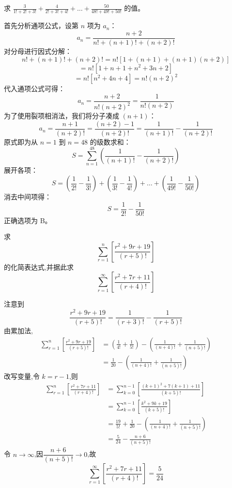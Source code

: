 \begin{questions}
    \question 求 $\frac{3}{1!+2!+3!} + \frac{4}{2!+3!+4!} + \dots + \frac{50}{48!+49!+50!}$ 的值。
\begin{solution}
首先分析通项公式，设第 $n$ 项为 $a_n$：
\[
a_n = \frac{n+2}{n! + (n+1)! + (n+2)!}
\]
对分母进行因式分解：
\[
n! + (n+1)! + (n+2)! = n! [1 + (n+1) + (n+1)(n+2)]
\]
\[
= n! [1 + n + 1 + n^2 + 3n + 2]
\]
\[
= n! [n^2 + 4n + 4] = n! (n+2)^2
\]
代入通项公式可得：
\[
a_n = \frac{n+2}{n! (n+2)^2} = \frac{1}{n! (n+2)}
\]
为了使用裂项相消法，我们将分子凑成 $(n+1)$：
\[
a_n = \frac{n+1}{(n+2)!} = \frac{(n+2) - 1}{(n+2)!} = \frac{1}{(n+1)!} - \frac{1}{(n+2)!}
\]
原式即为从 $n=1$ 到 $n=48$ 的级数求和：
\[
S = \sum_{n=1}^{48} \left( \frac{1}{(n+1)!} - \frac{1}{(n+2)!} \right)
\]
展开各项：
\[
S = \left( \frac{1}{2!} - \frac{1}{3!} \right) + \left( \frac{1}{3!} - \frac{1}{4!} \right) + \dots + \left( \frac{1}{49!} - \frac{1}{50!} \right)
\]
消去中间项得：
\[
S = \frac{1}{2!} - \frac{1}{50!}
\]
正确选项为 B。
\end{solution}

    \question 求
    \[
    \sum_{r=1}^{n}\left[\frac{r^2+9r+19}{(r+5)!}\right]
    \]
    的化简表达式,并据此求
    \[
    \sum_{r=1}^{\infty}\left[\frac{r^2+7r+11}{(r+4)!}\right]
    \]
    \begin{solution}
        注意到
        \[
        \frac{r^2+9r+19}{(r+5)!}
        =\frac{1}{(r+3)!}-\frac{1}{(r+5)!}
        \]
        由累加法,
        \begin{align*}
        \sum_{r=1}^{n}\left[\frac{r^2+9r+19}{(r+5)!}\right]
        &=\left(\frac{1}{4!}+\frac{1}{5!}\right)
        -\left(\frac{1}{(n+4)!}+\frac{1}{(n+5)!}\right)\\
        &=\frac{1}{20}-\left(\frac{1}{(n+4)!}+\frac{1}{(n+5)!}\right)
        \end{align*}
        改写变量,令 $k=r-1$,则
        \begin{align*}
        \sum_{r=1}^{n}\left[\frac{r^2+7r+11}{(r+4)!}\right]
        &=\sum_{k=0}^{n-1}\left[\frac{(k+1)^2+7(k+1)+11}{(k+5)!}\right]\\
        &=\sum_{k=0}^{n-1}\left[\frac{k^2+9k+19}{(k+5)!}\right]\\
        &= \frac{19}{5!} + \frac{1}{20}-\left(\frac{1}{(n+4)!}+\frac{1}{(n+5)!}\right)\\
        &= \frac{5}{24}-\frac{n+6}{(n+5)!}
        \end{align*}
        令 $n\to\infty$,因$\dfrac{n+6}{(n+5)!}\to 0$,故
        \[
        \sum_{r=1}^{\infty}\left[\frac{r^2+7r+11}{(r+4)!}\right]
        =\frac{5}{24}
        \]
    \end{solution}


\end{questions}
